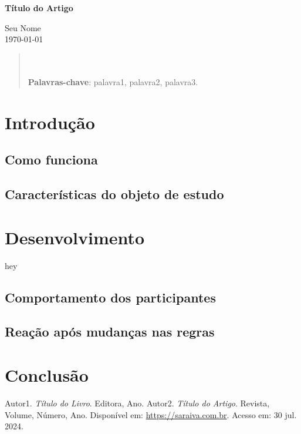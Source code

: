 \documentclass[a4paper,12pt]{article}
\begin{document}
\begin{center}
    \textbf{\huge Título do Artigo} \\[3cm]
\end{center}

\begin{flushright}
    Seu Nome \\[0.5cm]
    \today
\end{flushright}

\begin{abstract}
\noindent
\lipsum[1] \\ \\
\textbf{Palavras-chave}: palavra1, palavra2, palavra3.
\end{abstract}

\newpage

\renewcommand{\contentsname}{\centerline{\textbf{SUMÁRIO}}}
\tableofcontents
\newpage

\section{Introdução}
\lipsum[3-4] %

\subsection{Como funciona}
\lipsum[5-6] 
\cite{ref1}  %

\subsection{Características do objeto de estudo}
\lipsum[7-8]
\cite{ref1}

\section{Desenvolvimento}
\lipsum[9-10]
\cite{ref2}{hey}

\subsection{Comportamento dos participantes}
\lipsum[11-12]

\subsection{Reação após mudanças nas regras}
\lipsum[13-14]

\newpage

\section{Conclusão}
\lipsum[15-16]

\newpage

\begin{thebibliography}{9} %
     Autor1. \textit{Título do Livro}. Editora, Ano.
     Autor2. \textit{Título do Artigo}. Revista, Volume, Número, Ano. Disponível em: \url{https://saraiva.com.br}. Acesso em: 30 jul. 2024.
\end{thebibliography}
\end{document}
